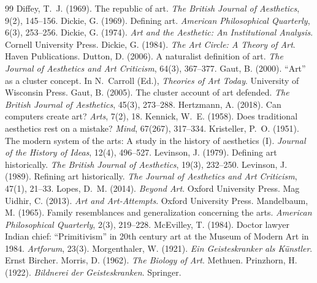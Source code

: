 \documentclass{situationist-preprint}
\begin{document}
\begin{thebibliography}{99}
 Diffey, T.~J. (1969). The republic of art. \emph{The British Journal of Aesthetics}, 9(2), 145--156.
 Dickie, G. (1969). Defining art. \emph{American Philosophical Quarterly}, 6(3), 253--256.
 Dickie, G. (1974). \emph{Art and the Aesthetic: An Institutional Analysis}. Cornell University Press.
 Dickie, G. (1984). \emph{The Art Circle: A Theory of Art}. Haven Publications.
 Dutton, D. (2006). A naturalist definition of art. \emph{The Journal of Aesthetics and Art Criticism}, 64(3), 367--377.
 Gaut, B. (2000). \enquote{Art} as a cluster concept. In N.~Carroll (Ed.), \emph{Theories of Art Today}. University of Wisconsin Press.
 Gaut, B. (2005). The cluster account of art defended. \emph{The British Journal of Aesthetics}, 45(3), 273--288.
 Hertzmann, A. (2018). Can computers create art? \emph{Arts}, 7(2), 18.
 Kennick, W.~E. (1958). Does traditional aesthetics rest on a mistake? \emph{Mind}, 67(267), 317--334.
 Kristeller, P.~O. (1951). The modern system of the arts: A study in the history of aesthetics (I). \emph{Journal of the History of Ideas}, 12(4), 496--527.
 Levinson, J. (1979). Defining art historically. \emph{The British Journal of Aesthetics}, 19(3), 232--250.
 Levinson, J. (1989). Refining art historically. \emph{The Journal of Aesthetics and Art Criticism}, 47(1), 21--33.
 Lopes, D.~M. (2014). \emph{Beyond Art}. Oxford University Press.
 Mag Uidhir, C. (2013). \emph{Art and Art-Attempts}. Oxford University Press.
 Mandelbaum, M. (1965). Family resemblances and generalization concerning the arts. \emph{American Philosophical Quarterly}, 2(3), 219--228.
 McEvilley, T. (1984). Doctor lawyer Indian chief: \enquote{Primitivism} in 20th century art at the Museum of Modern Art in 1984. \emph{Artforum}, 23(3).
 Morgenthaler, W. (1921). \emph{Ein Geisteskranker als K\"unstler}. Ernst Bircher.
 Morris, D. (1962). \emph{The Biology of Art}. Methuen.
 Prinzhorn, H. (1922). \emph{Bildnerei der Geisteskranken}. Springer.

\end{thebibliography}
\end{document}
